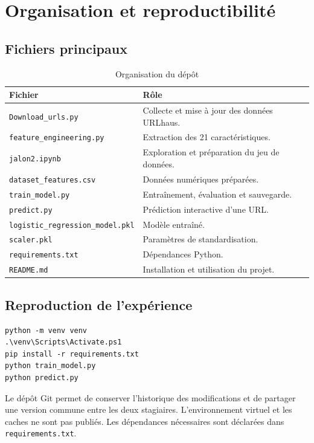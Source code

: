\documentclass[11pt,a4paper]{report}
\begin{document}
\chapter{Organisation et reproductibilité}

\section{Fichiers principaux}

\begin{table}[H]
\centering
\caption{Organisation du dépôt}
\begin{tabularx}{\textwidth}{p{}X}
\toprule
\textbf{Fichier} & \textbf{Rôle}\\
\midrule
\texttt{Download\_urls.py} & Collecte et mise à jour des données URLhaus.\\
\texttt{feature\_engineering.py} & Extraction des 21 caractéristiques.\\
\texttt{jalon2.ipynb} & Exploration et préparation du jeu de données.\\
\texttt{dataset\_features.csv} & Données numériques préparées.\\
\texttt{train\_model.py} & Entraînement, évaluation et sauvegarde.\\
\texttt{predict.py} & Prédiction interactive d'une URL.\\
\texttt{logistic\_regression\_model.pkl} & Modèle entraîné.\\
\texttt{scaler.pkl} & Paramètres de standardisation.\\
\texttt{requirements.txt} & Dépendances Python.\\
\texttt{README.md} & Installation et utilisation du projet.\\
\bottomrule
\end{tabularx}
\end{table}

\section{Reproduction de l'expérience}

\begin{lstlisting}[language={},caption={Installation et exécution sous Windows}]
python -m venv venv
.\venv\Scripts\Activate.ps1
pip install -r requirements.txt
python train_model.py
python predict.py
\end{lstlisting}

Le dépôt Git permet de conserver l'historique des modifications et de
partager une version commune entre les deux stagiaires. L'environnement
virtuel et les caches ne sont pas publiés. Les dépendances nécessaires sont
déclarées dans \texttt{requirements.txt}.
\end{document}
